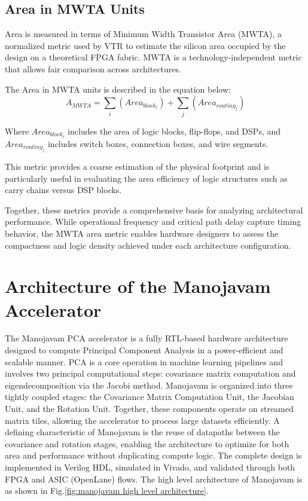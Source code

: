 \subsection{Area in MWTA Units}
Area is measured in terms of Minimum Width Transistor Area (MWTA), a normalized metric used by VTR to estimate the silicon area occupied by the design on a theoretical FPGA fabric. MWTA is a technology-independent metric that allows fair comparison across architectures.

The Area in MWTA units is described in the equation below:
\begin{equation}
	A_{MWTA} = \sum_{i}(Area_{block_i}) + \sum_{j}(Area_{routing_j})
\end{equation}

Where $Area_{block_i}$ includes the area of logic blocks, flip-flops, and DSPs, and $Area_{routing_j}$ includes switch boxes, connection boxes, and wire segments.

This metric provides a coarse estimation of the physical footprint and is particularly useful in evaluating the area efficiency of logic structures such as carry chains versus DSP blocks.

Together, these metrics provide a comprehensive basis for analyzing architectural performance. While operational frequency and critical path delay capture timing behavior, the MWTA area metric enables hardware designers to assess the compactness and logic density achieved under each architecture configuration.

\section{Architecture of the Manojavam Accelerator}
The Manojavam PCA accelerator is a fully RTL-based hardware architecture designed to compute Principal Component Analysis in a power-efficient and scalable manner. PCA is a core operation in machine learning pipelines and involves two principal computational steps: covariance matrix computation and eigendecomposition via the Jacobi method. Manojavam is organized into three tightly coupled stages: the Covariance Matrix Computation Unit, the Jacobian Unit, and the Rotation Unit. Together, these components operate on streamed matrix tiles, allowing the accelerator to process large datasets efficiently. A defining characteristic of Manojavam is the reuse of datapaths between the covariance and rotation stages, enabling the architecture to optimize for both area and performance without duplicating compute logic. The complete design is implemented in Verilog HDL, simulated in Vivado, and validated through both FPGA and ASIC (OpenLane) flows. The high level architecture of Manojavam is as shown in Fig.\ref{fig:manojavam high level architecture}.

